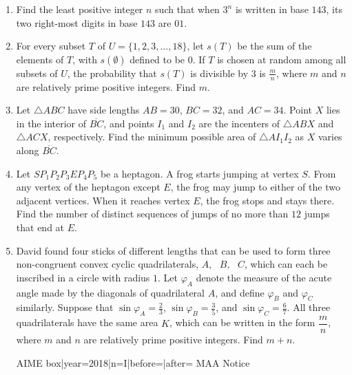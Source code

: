 \documentclass{article}
\begin{document}
\begin{enumerate}[label=\arabic*., itemsep=0.5em]
\par \vspace{0.5em}\item Find the least positive integer $n$ such that when $3^n$ is written in base $143$, its two right-most digits in base $143$ are $01$.\par \vspace{0.5em}\item For every subset $T$ of $U = \{ 1,2,3,\ldots,18 \}$, let $s(T)$ be the sum of the elements of $T$, with $s(\emptyset)$ defined to be $0$. If $T$ is chosen at random among all subsets of $U$, the probability that $s(T)$ is divisible by $3$ is $\frac{m}{n}$, where $m$ and $n$ are relatively prime positive integers. Find $m$.\par \vspace{0.5em}\item Let $\triangle ABC$ have side lengths $AB=30$, $BC=32$, and $AC=34$. Point $X$ lies in the interior of $\overline{BC}$, and points $I_1$ and $I_2$ are the incenters of $\triangle ABX$ and $\triangle ACX$, respectively. Find the minimum possible area of $\triangle AI_1I_2$ as $X$ varies along $\overline{BC}$.\par \vspace{0.5em}\item Let $SP_1P_2P_3EP_4P_5$ be a heptagon. A frog starts jumping at vertex $S$. From any vertex of the heptagon except $E$, the frog may jump to either of the two adjacent vertices. When it reaches vertex $E$, the frog stops and stays there. Find the number of distinct sequences of jumps of no more than $12$ jumps that end at $E$.\par \vspace{0.5em}\item David found four sticks of different lengths that can be used to form three non-congruent convex cyclic quadrilaterals, $A,\text{ }B,\text{ }C$, which can each be inscribed in a circle with radius $1$. Let $\varphi_A$ denote the measure of the acute angle made by the diagonals of quadrilateral $A$, and define $\varphi_B$ and $\varphi_C$ similarly. Suppose that $\sin\varphi_A=\frac{2}{3}$, $\sin\varphi_B=\frac{3}{5}$, and $\sin\varphi_C=\frac{6}{7}$. All three quadrilaterals have the same area $K$, which can be written in the form $\dfrac{m}{n}$, where $m$ and $n$ are relatively prime positive integers. Find $m+n$.



{{AIME box|year=2018|n=I|before=|after=}}
{{MAA Notice}}\par \vspace{0.5em}\end{enumerate}
\end{document}
